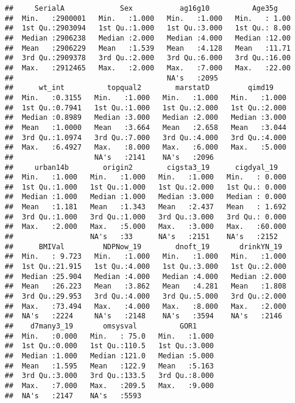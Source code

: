 \documentclass[
  11pt,
]{article}
\begin{document}
\begin{verbatim}
##     SerialA             Sex           ag16g10          Age35g     
##  Min.   :2900001   Min.   :1.000   Min.   :1.000   Min.   : 1.00  
##  1st Qu.:2903094   1st Qu.:1.000   1st Qu.:3.000   1st Qu.: 8.00  
##  Median :2906238   Median :2.000   Median :4.000   Median :12.00  
##  Mean   :2906229   Mean   :1.539   Mean   :4.128   Mean   :11.71  
##  3rd Qu.:2909378   3rd Qu.:2.000   3rd Qu.:6.000   3rd Qu.:16.00  
##  Max.   :2912465   Max.   :2.000   Max.   :7.000   Max.   :22.00  
##                                    NA's   :2095                   
##      wt_int          topqual2        marstatD         qimd19     
##  Min.   :0.3155   Min.   :1.000   Min.   :1.000   Min.   :1.000  
##  1st Qu.:0.7941   1st Qu.:1.000   1st Qu.:2.000   1st Qu.:2.000  
##  Median :0.8989   Median :3.000   Median :2.000   Median :3.000  
##  Mean   :1.0000   Mean   :3.664   Mean   :2.658   Mean   :3.044  
##  3rd Qu.:1.0974   3rd Qu.:7.000   3rd Qu.:4.000   3rd Qu.:4.000  
##  Max.   :6.4927   Max.   :8.000   Max.   :6.000   Max.   :5.000  
##                   NA's   :2141    NA's   :2096                   
##     urban14b        origin2        cigsta3_19      cigdyal_19    
##  Min.   :1.000   Min.   :1.000   Min.   :1.000   Min.   : 0.000  
##  1st Qu.:1.000   1st Qu.:1.000   1st Qu.:2.000   1st Qu.: 0.000  
##  Median :1.000   Median :1.000   Median :3.000   Median : 0.000  
##  Mean   :1.181   Mean   :1.343   Mean   :2.437   Mean   : 1.692  
##  3rd Qu.:1.000   3rd Qu.:1.000   3rd Qu.:3.000   3rd Qu.: 0.000  
##  Max.   :2.000   Max.   :5.000   Max.   :3.000   Max.   :60.000  
##                  NA's   :33      NA's   :2151    NA's   :2152    
##      BMIVal         NDPNow_19        dnoft_19       drinkYN_19   
##  Min.   : 9.723   Min.   :1.000   Min.   :1.000   Min.   :1.000  
##  1st Qu.:21.915   1st Qu.:4.000   1st Qu.:3.000   1st Qu.:2.000  
##  Median :25.904   Median :4.000   Median :4.000   Median :2.000  
##  Mean   :26.223   Mean   :3.862   Mean   :4.281   Mean   :1.808  
##  3rd Qu.:29.953   3rd Qu.:4.000   3rd Qu.:5.000   3rd Qu.:2.000  
##  Max.   :73.494   Max.   :4.000   Max.   :8.000   Max.   :2.000  
##  NA's   :2224     NA's   :2148    NA's   :3594    NA's   :2146   
##    d7many3_19       omsysval          GOR1      
##  Min.   :0.000   Min.   : 75.0   Min.   :1.000  
##  1st Qu.:0.000   1st Qu.:110.5   1st Qu.:3.000  
##  Median :1.000   Median :121.0   Median :5.000  
##  Mean   :1.595   Mean   :122.9   Mean   :5.163  
##  3rd Qu.:3.000   3rd Qu.:133.5   3rd Qu.:8.000  
##  Max.   :7.000   Max.   :209.5   Max.   :9.000  
##  NA's   :2147    NA's   :5593
\end{verbatim}
\end{document}
